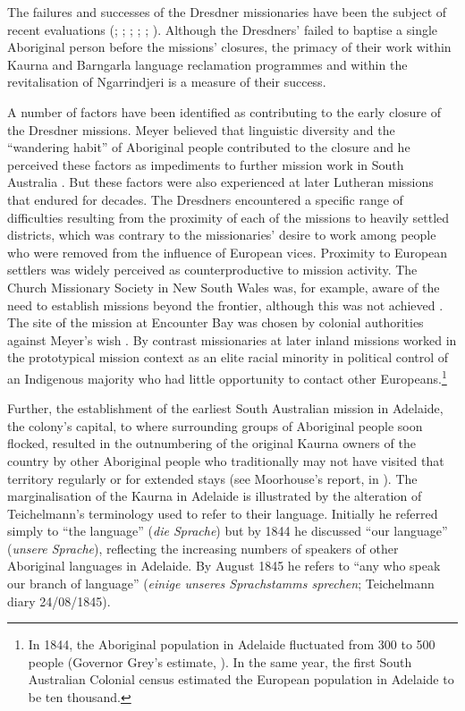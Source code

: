The failures and successes of the Dresdner missionaries have been the subject of recent evaluations (\citealt{amery2004}; \citeyear{amery_warrabarna_2016}; \citealt{scrimgeour_colinizers_2007}; \citealt{gale_nothing_2011}; \citealt{lockwood_vision_2007}; \citeyear{lockwood_two_2014}). Although the Dresdners' failed to baptise a single Aboriginal person before the missions' closures, the primacy of their work within Kaurna and Barngarla language reclamation programmes and within the revitalisation of Ngarrindjeri is a measure of their success.

A number of factors have been identified as contributing to the early closure of the Dresdner missions. Meyer believed that linguistic diversity and the “wandering habit” of Aboriginal people contributed to the closure and he perceived these factors as impediments to further mission work in South Australia \citep[43--45]{zweck_for_2012}. But these factors were also experienced at later Lutheran missions that endured for decades. The Dresdners encountered a specific range of difficulties resulting from the proximity of each of the missions to heavily settled districts, which was contrary to the missionaries' desire to work among people who were removed from the influence of European vices. Proximity to European settlers was widely perceived as counterproductive to mission activity. The Church Missionary Society in New South Wales was, for example, aware of the need to establish missions beyond the frontier, although this was not achieved \citep[283]{bridges_church_1978}. The site of the mission at Encounter Bay was chosen by colonial authorities against Meyer’s wish \citep[16]{lockwood_vision_2007}. By contrast missionaries at later inland missions worked in the prototypical mission context as an elite racial minority in political control of an Indigenous majority who had little opportunity to contact other Europeans.\footnote{In 1844, the Aboriginal population in Adelaide fluctuated from 300 to 500 people (Governor Grey’s estimate, \citealt[151]{scrimgeour_2006}). In the same year, the first South Australian Colonial census estimated the European population in Adelaide to be ten thousand.}  

Further, the establishment of the earliest South Australian mission in Adelaide, the colony’s capital, to where surrounding groups of Aboriginal people soon flocked, resulted in the outnumbering of the original Kaurna owners of the country by other Aboriginal people who traditionally may not have visited that territory regularly or for extended stays (see Moorhouse’s report, in \citealt[59--60]{foster_two_1990}). The marginalisation of the Kaurna in Adelaide is illustrated by the alteration of Teichelmann’s terminology used to refer to their language. Initially he referred simply to “the language” (\textit{die Sprache}) but by 1844 he discussed “our language” (\textit{unsere Sprache}), reflecting the increasing numbers of speakers of other Aboriginal languages in Adelaide. By August 1845 he refers to “any who speak our branch of language” (\textit{einige unseres Sprachstamms sprechen}; Teichelmann diary 24/08/1845). 

